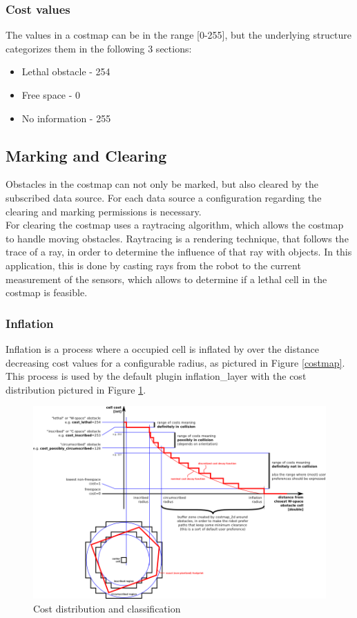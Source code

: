 \subsubsection{Cost values}
The values in a costmap can be in the range [0-255], but the underlying structure categorizes them in the following 3 sections:
\begin{itemize}
	\item Lethal obstacle - 254
	\item Free space - 0
	\item No information - 255
\end{itemize}

\subsection{Marking and Clearing}
Obstacles in the costmap can not only be marked, but also cleared by the subscribed data source. For each data source a configuration regarding the clearing and marking permissions is necessary.\\
For clearing the costmap uses a raytracing algorithm, which allows the costmap to handle moving obstacles\cite{costmap}. Raytracing is a rendering technique, that follows the trace of a ray, in order to determine the influence of that ray with objects. 
In this application, this is done by casting rays from the robot to the current measurement of the sensors, which allows to determine if a lethal cell in the costmap is feasible.
\subsubsection{Inflation}
Inflation is a process where a occupied cell is inflated by over the distance decreasing cost values for a configurable radius, as pictured in Figure \ref{costmap}.\\
This process is used by the default plugin inflation\_layer with the cost distribution pictured in Figure \ref{costdistribution}\cite{costmap}.

\begin{figure} 
	\centering
	\includegraphics[width=\linewidth]{Pictures/costmapinflation}
	\caption{Cost distribution and classification \cite{costmap}}
	\label{costdistribution}
\end{figure}

